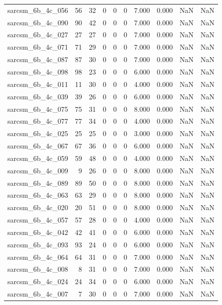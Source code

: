 \documentclass{article}
\begin{document}
\begin{longtable}{lrrrrrrrrr}
sarcsm\_6b\_4c\_056 & 56 & 32 & 0 & 0 & 0 & 7.000 & 0.000 & NaN & NaN \\
sarcsm\_6b\_4c\_090 & 90 & 42 & 0 & 0 & 0 & 7.000 & 0.000 & NaN & NaN \\
sarcsm\_6b\_4c\_027 & 27 & 27 & 0 & 0 & 0 & 7.000 & 0.000 & NaN & NaN \\
sarcsm\_6b\_4c\_071 & 71 & 29 & 0 & 0 & 0 & 7.000 & 0.000 & NaN & NaN \\
sarcsm\_6b\_4c\_087 & 87 & 30 & 0 & 0 & 0 & 7.000 & 0.000 & NaN & NaN \\
sarcsm\_6b\_4c\_098 & 98 & 23 & 0 & 0 & 0 & 6.000 & 0.000 & NaN & NaN \\
sarcsm\_6b\_4c\_011 & 11 & 30 & 0 & 0 & 0 & 4.000 & 0.000 & NaN & NaN \\
sarcsm\_6b\_4c\_039 & 39 & 26 & 0 & 0 & 0 & 6.000 & 0.000 & NaN & NaN \\
sarcsm\_6b\_4c\_075 & 75 & 31 & 0 & 0 & 0 & 8.000 & 0.000 & NaN & NaN \\
sarcsm\_6b\_4c\_077 & 77 & 34 & 0 & 0 & 0 & 4.000 & 0.000 & NaN & NaN \\
sarcsm\_6b\_4c\_025 & 25 & 25 & 0 & 0 & 0 & 3.000 & 0.000 & NaN & NaN \\
sarcsm\_6b\_4c\_067 & 67 & 36 & 0 & 0 & 0 & 6.000 & 0.000 & NaN & NaN \\
sarcsm\_6b\_4c\_059 & 59 & 48 & 0 & 0 & 0 & 4.000 & 0.000 & NaN & NaN \\
sarcsm\_6b\_4c\_009 & 9 & 26 & 0 & 0 & 0 & 8.000 & 0.000 & NaN & NaN \\
sarcsm\_6b\_4c\_089 & 89 & 50 & 0 & 0 & 0 & 8.000 & 0.000 & NaN & NaN \\
sarcsm\_6b\_4c\_063 & 63 & 29 & 0 & 0 & 0 & 8.000 & 0.000 & NaN & NaN \\
sarcsm\_6b\_4c\_020 & 20 & 51 & 0 & 0 & 0 & 8.000 & 0.000 & NaN & NaN \\
sarcsm\_6b\_4c\_057 & 57 & 28 & 0 & 0 & 0 & 4.000 & 0.000 & NaN & NaN \\
sarcsm\_6b\_4c\_042 & 42 & 41 & 0 & 0 & 0 & 6.000 & 0.000 & NaN & NaN \\
sarcsm\_6b\_4c\_093 & 93 & 24 & 0 & 0 & 0 & 6.000 & 0.000 & NaN & NaN \\
sarcsm\_6b\_4c\_064 & 64 & 31 & 0 & 0 & 0 & 7.000 & 0.000 & NaN & NaN \\
sarcsm\_6b\_4c\_008 & 8 & 31 & 0 & 0 & 0 & 7.000 & 0.000 & NaN & NaN \\
sarcsm\_6b\_4c\_024 & 24 & 34 & 0 & 0 & 0 & 6.000 & 0.000 & NaN & NaN \\
sarcsm\_6b\_4c\_007 & 7 & 30 & 0 & 0 & 0 & 7.000 & 0.000 & NaN & NaN \\

\end{longtable}
\end{document}
